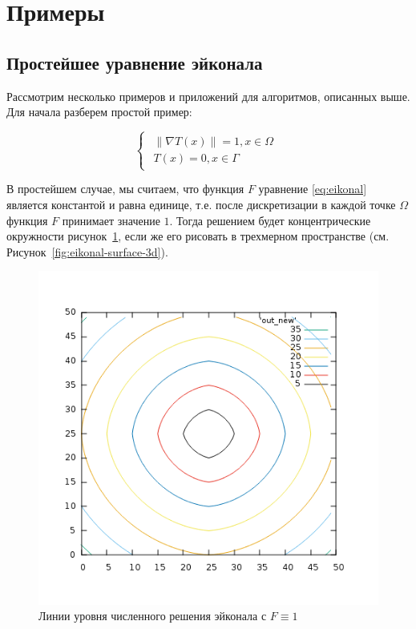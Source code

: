 \section{Примеры}
\label{sec:samples}

\subsection{Простейшее уравнение эйконала}
\label{sec:simple-eikonal}

Рассмотрим несколько примеров и приложений для алгоритмов, описанных
выше. Для начала разберем простой пример:


\begin{equation}
  \label{eq:eik-sur}
  \begin{cases} \begin{array}{ll}
      \| \nabla T(x) \| = 1, x \in \Omega \\
      T(x) = 0, x \in \Gamma
    \end{array}\end{cases}
\end{equation}

В простейшем случае, мы считаем, что функция $F$ уравнение
\eqref{eq:eikonal} является константой и равна единице, т.е. после
дискретизации в каждой точке $\Omega$ функция $F$ принимает значение
$1$. Тогда решением будет концентрические окружности
рисунок~\ref{fig:eikonal-surface}, если же его рисовать в трехмерном
пространстве (см. Рисунок~\ref{fig:eikonal-surface-3d}).

\begin{figure}[H]
  \centering
  \includegraphics[width=0.7\linewidth]{img/eikonal_simple_surface.png}
  \hfil \caption{Линии уровня численного решения эйконала с $F\equiv 1$ }
  \label{fig:eikonal-surface}
\end{figure}

